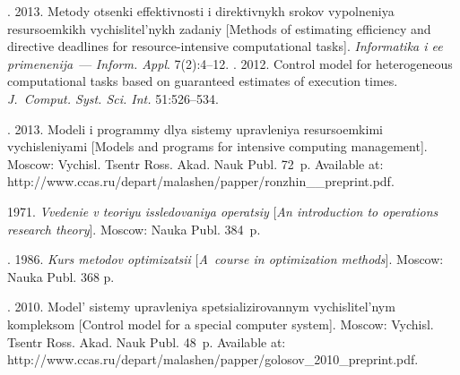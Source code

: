 


  \begin{multicols}{2}

\renewcommand{\bibname}{\protect\rmfamily References}

{\small\frenchspacing
{%
\begin{thebibliography}{9}

. 2013. Metody otsenki effektivnosti i  direktivnykh 
srokov vypolneniya  resursoemkikh vychislitel'nykh zadaniy 
[Methods of estimating efficiency and directive deadlines for resource-intensive 
computational tasks]. \textit{Informatika i ee primenenija}~--- \textit{Inform. Appl}.  
7(2):4--12.
. 2012. 
Control model for heterogeneous computational tasks based on guaranteed 
estimates of execution times. \textit{J.~Comput. Syst. Sci. Int.}  51:526--534.  

. 2013. Modeli i programmy dlya sistemy upravleniya 
resursoemkimi vychisleniyami  
[Models and programs for intensive computing management]. 
Moscow: Vychisl. Tsentr Ross. Akad. Nauk Publ. 72~p.
Available at: {\sf http://www.ccas.ru/depart/malashen/papper/ronzhin\_\_preprint.pdf}. 

 1971. \textit{Vvedenie v teoriyu issledovaniya operatsiy} 
[\textit{An introduction to operations research theory}]. Moscow: Nauka Publ. 384~p. 

. 
1986. \textit{Kurs metodov optimizatsii}  
[\textit{A~course in optimization methods}]. Moscow: Nauka Publ. 368 p. 

.   2010. 
Model' sistemy upravleniya spetsializirovannym vychislitel'nym kompleksom 
[Control model for a special computer system]. Moscow: Vychisl. \mbox{Tsentr} Ross. 
Akad. Nauk Publ. 48~p. 
Available at: {\sf http://www.ccas.ru/depart/malashen/\linebreak papper/golosov\_2010\_preprint.pdf}.


\end{thebibliography}}}
\end{multicols}
